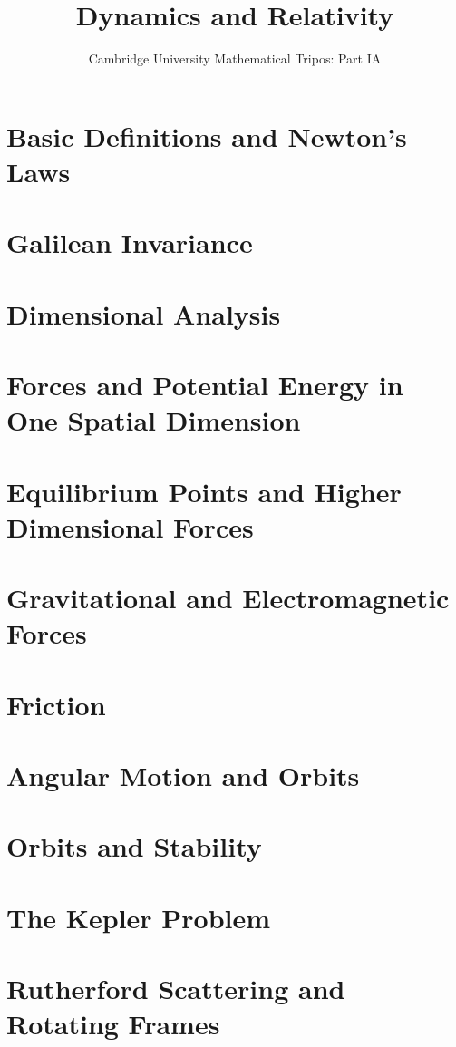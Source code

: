 \documentclass{article}
\title{Dynamics and Relativity}
\author{Cambridge University Mathematical Tripos: Part IA}
\begin{document}
\maketitle

\tableofcontentsnewpage{}

\section{Basic Definitions and Newton's Laws}

\section{Galilean Invariance}

\section{Dimensional Analysis}

\section{Forces and Potential Energy in One Spatial Dimension}

\section{Equilibrium Points and Higher Dimensional Forces}

\section{Gravitational and Electromagnetic Forces}

\section{Friction}

\section{Angular Motion and Orbits}

\section{Orbits and Stability}

\section{The Kepler Problem}

\section{Rutherford Scattering and Rotating Frames}

\end{document}

